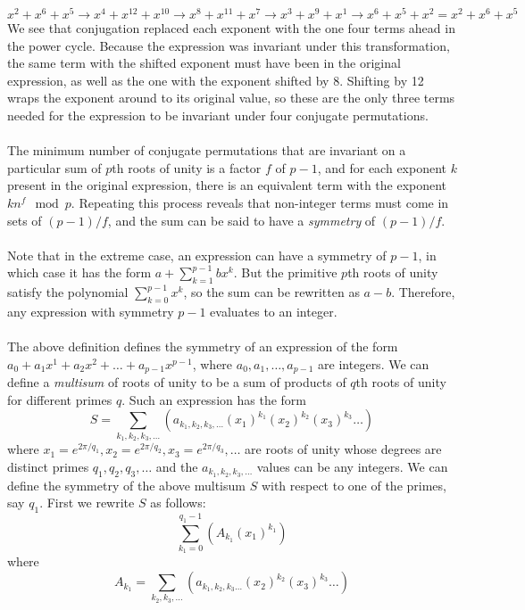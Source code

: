 \documentclass{article}
\begin{document}
    $$ x^2 + x^6 + x^5 \rightarrow x^4 + x^{12} + x^{10} \rightarrow x^8 + x^{11} + x^7 \rightarrow x^3 + x^9 + x^1 \rightarrow x^6 + x^5 + x^2 = x^2 + x^6 + x^5 $$
    We see that conjugation replaced each exponent with the one four terms ahead in the power cycle. Because the expression was invariant under this transformation, the same term with the shifted exponent must have been in the original expression, as well as the one with the exponent shifted by 8. Shifting by 12 wraps the exponent around to its original value, so these are the only three terms needed for the expression to be invariant under four conjugate permutations.\\
    \\
    The minimum number of conjugate permutations that are invariant on a particular sum of $ p $th roots of unity is a factor $ f $ of $ p - 1 $, and for each exponent $ k $ present in the original expression, there is an equivalent term with the exponent $ kn^f \mod p $. Repeating this process reveals that non-integer terms must come in sets of $ (p - 1)/f $, and the sum can be said to have a \textit{symmetry} of $ (p - 1)/f $.\\
    \\
    Note that in the extreme case, an expression can have a symmetry of $ p - 1 $, in which case it has the form $ a + \sum_{k = 1}^{p - 1} bx^k $. But the primitive $ p $th roots of unity satisfy the polynomial $ \sum_{k = 0}^{p - 1} x^k $, so the sum can be rewritten as $ a - b $. Therefore, any expression with symmetry $ p - 1 $ evaluates to an integer.\\
    \\
    The above definition defines the symmetry of an expression of the form $ a_0 + a_1 x^1 + a_2 x^2 + \dots + a_{p - 1} x^{p - 1} $, where $ a_0, a_1, \dots, a_{p - 1} $ are integers. We can define a \textit{multisum} of roots of unity to be a sum of products of $ q $th roots of unity for different primes $ q $. Such an expression has the form
    $$ S = \sum_{k_1, k_2, k_3, \dots} (a_{k_1, k_2, k_3, \dots} (x_1)^{k_1} (x_2)^{k_2} (x_3)^{k_3} \dots) $$
    where $ x_1 = e^{2\pi/q_1}, x_2 = e^{2\pi/q_2}, x_3 = e^{2\pi/q_3}, \dots $ are roots of unity whose degrees are distinct primes $ q_1, q_2, q_3, \dots $ and the $ a_{k_1, k_2, k_3, \dots} $ values can be any integers. We can define the symmetry of the above multisum $ S $ with respect to one of the primes, say $ q_1 $. First we rewrite $ S $ as follows:
    $$ \sum_{k_1 = 0}^{q_1 - 1} (A_{k_1} (x_1)^{k_1}) $$
    where
    $$ A_{k_1} = \sum_{k_2, k_3, \dots} (a_{k_1, k_2, k_3 \dots} (x_2)^{k_2} (x_3)^{k_3} \dots) $$
\end{document}
